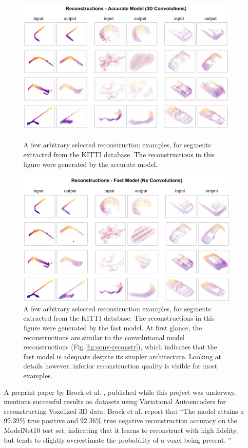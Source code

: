 \begin{figure}[p]
  \centering
  \includegraphics[width=5.2in]{images/convreconstructions.pdf}
  \caption{A few arbitrary selected reconstruction examples, for segments extracted from the KITTI database. The reconstructions in this figure were generated by the accurate model.}
  \label{fig:conv-reconstr}
  \hfill
  \includegraphics[width=5.2in]{images/noconvreconstructions.pdf}
  \caption{A few arbitrary selected reconstruction examples, for segments extracted from the KITTI database. The reconstructions in this figure were generated by the fast model. At first glance, the reconstructions are similar to the convolutional model reconstructions (Fig.\ref{fig:conv-reconstr}), which indicates that the fast model is adequate despite its simpler architecture. Looking at details however, inferior reconstruction quality is visible for most examples.}
  \label{fig:noconv-reconstr}
\end{figure}

A preprint paper by Brock et al.  \cite{voxel-autoencoder}, published while this project was underway,  mentions successful results on datasets using Variational Autoencoders for reconstructing Voxelized 3D data.
Brock et al. \cite{voxel-autoencoder} report that ``The model attains a 99.39\% true positive and 92.36\% true negative reconstruction accuracy on the ModelNet10 test set, indicating that it learns to reconstruct with high fidelity, but tends to slightly overestimate the probability of a voxel being present. ''\\

